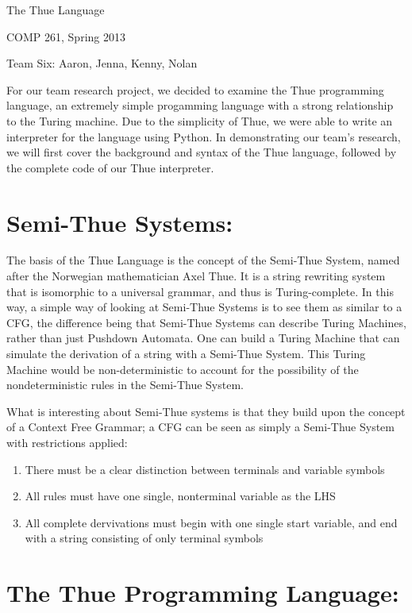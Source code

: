 \documentclass[12pt]{article}
\begin{document}
\begin{center}

The Thue Language

COMP 261, Spring 2013

Team Six: Aaron, Jenna, Kenny, Nolan
\end{center}
For our team research project, we decided to examine the Thue programming language, an extremely simple progamming language with a strong relationship to the Turing machine.  Due to the simplicity of Thue, we were able to write an interpreter for the language using Python.  In demonstrating our team's research, we will first cover the background and syntax of the Thue language, followed by the complete code of our Thue interpreter.

\section{Semi-Thue Systems:}
The basis of the Thue Language is the concept of the Semi-Thue System, named after the Norwegian mathematician Axel Thue.  It is a string rewriting system that is isomorphic to a universal grammar, and thus is Turing-complete.  In this way, a simple way of looking at Semi-Thue Systems is to see them as similar to a CFG, the difference being that Semi-Thue Systems can describe Turing Machines, rather than just Pushdown Automata. One can build a Turing Machine that can simulate the derivation of a string with a Semi-Thue System. This Turing Machine would be non-deterministic to account for the possibility of the nondeterministic rules in the Semi-Thue System. 

What is interesting about Semi-Thue systems is that they build upon the concept of a Context Free Grammar; a CFG can be seen as simply a Semi-Thue System with restrictions applied:

\begin{enumerate}
	\item There must be a clear distinction between terminals and variable symbols
	\item All rules must have one single, nonterminal variable as the LHS
	\item All complete dervivations must begin with one single start variable, and end with a string consisting of only terminal symbols
\end{enumerate}

 

\section{The Thue Programming Language:}
\end{document}
